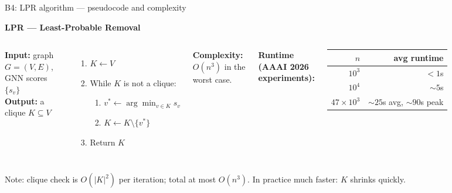\documentclass[aspectratio=169,10pt,dvipsnames]{beamer}
\begin{document}
\begin{frame}[fragile]{B4: LPR algorithm — pseudocode and complexity}

\textbf{LPR — Least-Probable Removal}

\medskip
\begin{columns}[T]
\textbf{Input:} graph $G=(V,E)$, GNN scores $\{s_v\}$\\
\textbf{Output:} a clique $K \subseteq V$

\medskip
\begin{enumerate}\small
  \item $K \leftarrow V$
  \item While $K$ is not a clique:
  \begin{enumerate}
    \item $v^* \leftarrow \arg\min_{v \in K} s_v$
    \item $K \leftarrow K \setminus \{v^*\}$
  \end{enumerate}
  \item Return $K$
\end{enumerate}

\textbf{Complexity:} $O(n^3)$ in the worst case.

\medskip
\textbf{Runtime (AAAI 2026 experiments):}
\small\renewcommand{\arraystretch}{1.2}
\begin{tabular}{@{}rr@{}}
\toprule
$n$ & avg runtime \\
\midrule
$10^3$ & $< 1$s \\
$10^4$ & $\sim 5$s \\
$47 \times 10^3$ & $\sim 25$s avg, $\sim 90$s peak \\
\bottomrule
\end{tabular}
\end{columns}

\medskip\small
Note: clique check is $O(|K|^2)$ per iteration; total at most $O(n^3)$. In practice much faster: $K$ shrinks quickly.
\end{frame}
\end{document}
